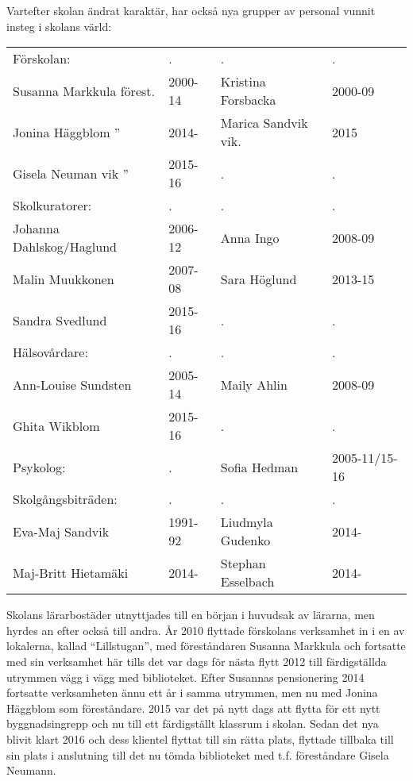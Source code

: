 Vartefter skolan ändrat karaktär, har också nya grupper av personal vunnit insteg i skolans värld:
\begin{center}
  \begin{tabular}{l l l l}
    \hline
    Förskolan: & . & . & . \\
    Susanna Markkula förest. & 2000-14 & Kristina Forsbacka & 2000-09 \\
    Jonina Häggblom  '' & 2014- & Marica Sandvik vik. & 2015 \\
    Gisela Neuman vik '' & 2015-16 & . & . \\
    Skolkuratorer: & . & . & . \\
    Johanna Dahlskog/Haglund & 2006-12 & Anna Ingo & 2008-09 \\
    Malin Muukkonen & 2007-08 & Sara Höglund & 2013-15 \\
    Sandra Svedlund & 2015-16 & . & . \\
    Hälsovårdare: & . & . & . \\
    Ann-Louise Sundsten & 2005-14 & Maily Ahlin & 2008-09 \\
    Ghita Wikblom & 2015-16 & . & . \\
    Psykolog: & . & Sofia Hedman & 2005-11/15-16 \\
    Skolgångsbiträden: & . & . & . \\
    Eva-Maj Sandvik & 1991-92 & Liudmyla Gudenko & 2014- \\
    Maj-Britt Hietamäki & 2014- & Stephan Esselbach & 2014- \\
    \hline
  \end{tabular}
\end{center}

Skolans lärarbostäder utnyttjades till en början i huvudsak av lärarna, men hyrdes an efter också till andra. År 2010 flyttade förskolans verksamhet in i en av lokalerna, kallad ``Lillstugan'', med föreståndaren Susanna Markkula och fortsatte med sin verksamhet här tills det var dags för nästa flytt 2012 till färdigställda utrymmen vägg i vägg med biblioteket. Efter Susannas pensionering 2014 fortsatte verksamheten ännu ett år i samma utrymmen, men nu med Jonina Häggblom som föreståndare. 2015 var det på nytt dags att flytta för ett nytt byggnadsingrepp och nu till ett färdigställt klassrum i skolan. Sedan det nya  blivit klart 2016 och dess klientel flyttat till sin rätta plats, flyttade  tillbaka till sin plats i anslutning till det nu tömda biblioteket med t.f. föreståndare  Gisela Neumann.

